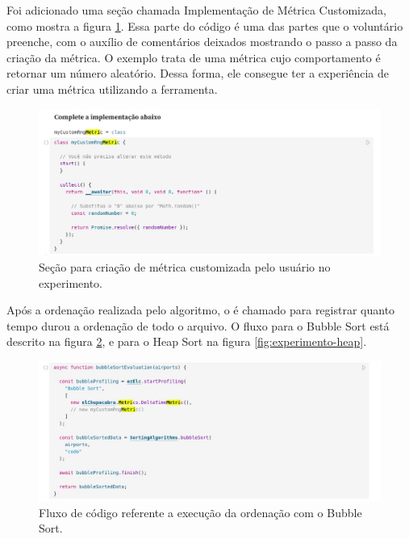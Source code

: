 \documentclass[12pt]{tcc}
\begin{document}
	Foi adicionado uma seção chamada Implementação de Métrica Customizada, como mostra a figura \ref{fig:metrica-observable}. Essa parte do código é uma das partes que o voluntário preenche, com o auxílio de comentários deixados mostrando o passo a passo da criação da métrica. O exemplo trata de uma métrica cujo comportamento é retornar um número aleatório. Dessa forma, ele consegue ter a experiência de criar uma métrica utilizando a ferramenta.

	\begin{figure}[!ht]
		\centering
		\includegraphics[width=1\textwidth]{figures/experimento-metrica.jpeg}
		\caption{Seção para criação de métrica customizada pelo usuário no experimento.}
		\label{fig:metrica-observable}
	\end{figure}


	Após a ordenação realizada pelo algoritmo, o  é chamado para registrar quanto tempo durou a ordenação de todo o arquivo. O fluxo para o Bubble Sort está descrito na figura \ref{fig:experimento-bubble}, e para o Heap Sort na figura \ref{fig:experimento-heap}.

	\begin{figure}[!ht]
		\centering
		\includegraphics[width=1\textwidth]{figures/experimento-bubble.jpeg}
		\caption{Fluxo de código referente a execução da ordenação com o Bubble Sort.}
		\label{fig:experimento-bubble}
	\end{figure}
\end{document}
